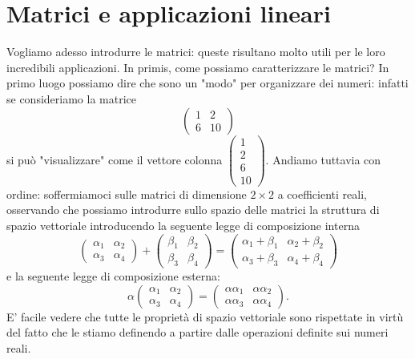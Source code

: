 \chapter{Matrici e applicazioni lineari}

Vogliamo adesso introdurre le matrici: queste risultano molto utili per le loro incredibili applicazioni. In primis, come possiamo caratterizzare le matrici? In primo luogo possiamo dire che sono un "modo" per organizzare dei numeri: infatti se consideriamo la matrice
$$
\begin{pmatrix}
  1 & 2 \\
  6 & 10
\end{pmatrix} 
$$si può "visualizzare" come il vettore colonna $\begin{pmatrix} 1 \\ 2 \\ 6 \\ 10 \end{pmatrix}$. Andiamo tuttavia con ordine: soffermiamoci sulle matrici di dimensione $2 \times 2$ a coefficienti reali, osservando che possiamo introdurre sullo spazio delle matrici la struttura di spazio vettoriale introducendo la seguente legge di composizione interna
$$
  \begin{pmatrix}
  \alpha_1 & \alpha_2 \\
  \alpha_3 & \alpha_4
  \end{pmatrix} + \begin{pmatrix}  
  \beta_1 & \beta_2 \\
  \beta_3 & \beta_4
  \end{pmatrix} = \begin{pmatrix}
    \alpha_1 + \beta_1 & \alpha_2 + \beta_2 \\
    \alpha_3 + \beta_3 & \alpha_4 + \beta_4
  \end{pmatrix}
$$
e la seguente legge di composizione esterna:
$$
  \alpha \begin{pmatrix}
    \alpha_1 & \alpha_2 \\
    \alpha_3 & \alpha_4
  \end{pmatrix} = \begin{pmatrix}
    \alpha \alpha_1 & \alpha \alpha_2 \\
    \alpha \alpha_3 & \alpha \alpha_4
  \end{pmatrix}.
$$
E' facile vedere che tutte le proprietà di spazio vettoriale sono rispettate in virtù del fatto che le stiamo definendo a partire dalle operazioni definite sui numeri reali. \\
